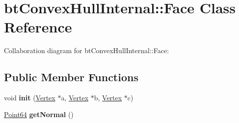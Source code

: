 \hypertarget{classbt_convex_hull_internal_1_1_face}{\section{bt\+Convex\+Hull\+Internal\+:\+:Face Class Reference}
\label{classbt_convex_hull_internal_1_1_face}
}


Collaboration diagram for bt\+Convex\+Hull\+Internal\+:\+:Face\+:
\subsection*{Public Member Functions}
\begin{DoxyCompactItemize}
\item 
\hypertarget{classbt_convex_hull_internal_1_1_face_a96e1e2caa88fc7438dd7270f188bfafd}{void {\bfseries init} (\hyperlink{classbt_convex_hull_internal_1_1_vertex}{Vertex} $\ast$a, \hyperlink{classbt_convex_hull_internal_1_1_vertex}{Vertex} $\ast$b, \hyperlink{classbt_convex_hull_internal_1_1_vertex}{Vertex} $\ast$c)}\label{classbt_convex_hull_internal_1_1_face_a96e1e2caa88fc7438dd7270f188bfafd}

\item 
\hypertarget{classbt_convex_hull_internal_1_1_face_a641f6cbe6273a95b92f8beb8a8110935}{\hyperlink{classbt_convex_hull_internal_1_1_point64}{Point64} {\bfseries get\+Normal} ()}\label{classbt_convex_hull_internal_1_1_face_a641f6cbe6273a95b92f8beb8a8110935}

\end{DoxyCompactItemize}
